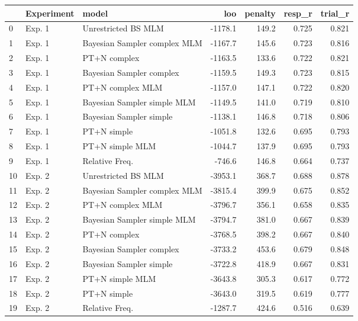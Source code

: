 \begin{tabular}{lllrrrr}
\toprule
{} & Experiment &                         model &     loo &  penalty &  resp\_r &  trial\_r \\
\midrule
0  &     Exp. 1 &           Unrestricted BS MLM & -1178.1 &    149.2 &   0.725 &    0.821 \\
1  &     Exp. 1 &  Bayesian Sampler complex MLM & -1167.7 &    145.6 &   0.723 &    0.816 \\
2  &     Exp. 1 &                  PT+N complex & -1163.5 &    133.6 &   0.722 &    0.821 \\
3  &     Exp. 1 &      Bayesian Sampler complex & -1159.5 &    149.3 &   0.723 &    0.815 \\
4  &     Exp. 1 &              PT+N complex MLM & -1157.0 &    147.1 &   0.722 &    0.820 \\
5  &     Exp. 1 &   Bayesian Sampler simple MLM & -1149.5 &    141.0 &   0.719 &    0.810 \\
6  &     Exp. 1 &       Bayesian Sampler simple & -1138.1 &    146.8 &   0.718 &    0.806 \\
7  &     Exp. 1 &                   PT+N simple & -1051.8 &    132.6 &   0.695 &    0.793 \\
8  &     Exp. 1 &               PT+N simple MLM & -1044.7 &    137.9 &   0.695 &    0.793 \\
9  &     Exp. 1 &                Relative Freq. &  -746.6 &    146.8 &   0.664 &    0.737 \\
10 &     Exp. 2 &           Unrestricted BS MLM & -3953.1 &    368.7 &   0.688 &    0.878 \\
11 &     Exp. 2 &  Bayesian Sampler complex MLM & -3815.4 &    399.9 &   0.675 &    0.852 \\
12 &     Exp. 2 &              PT+N complex MLM & -3796.7 &    356.1 &   0.658 &    0.835 \\
13 &     Exp. 2 &   Bayesian Sampler simple MLM & -3794.7 &    381.0 &   0.667 &    0.839 \\
14 &     Exp. 2 &                  PT+N complex & -3768.5 &    398.2 &   0.667 &    0.840 \\
15 &     Exp. 2 &      Bayesian Sampler complex & -3733.2 &    453.6 &   0.679 &    0.848 \\
16 &     Exp. 2 &       Bayesian Sampler simple & -3722.8 &    418.9 &   0.667 &    0.831 \\
17 &     Exp. 2 &               PT+N simple MLM & -3643.8 &    305.3 &   0.617 &    0.772 \\
18 &     Exp. 2 &                   PT+N simple & -3643.0 &    319.5 &   0.619 &    0.777 \\
19 &     Exp. 2 &                Relative Freq. & -1287.7 &    424.6 &   0.516 &    0.639 \\
\bottomrule
\end{tabular}
